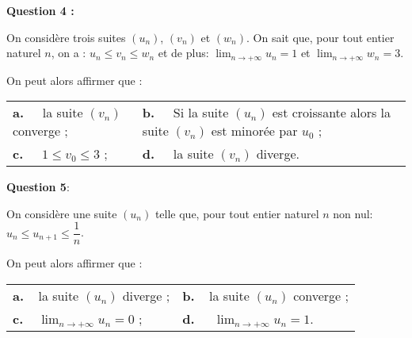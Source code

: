 \documentclass[11pt,a4paper,french]{article}
\newcommand{\N}{\mathbb{N}}
\begin{document}
\textbf{Question 4 :}

\medskip

On considère trois suites $\left(u_n\right)$, $\left(v_n\right)$ et $\left(w_n\right)$. On sait que, pour tout entier naturel $n$, on a : $u_n \leqslant v_n\leqslant  w_n$ et de plus: $\displaystyle\lim_{n \to + \infty} u_n= 1$ et $\displaystyle\lim_{n \to + \infty} w_n= 3$.

On peut alors affirmer que :

\begin{center}
\begin{tabularx}{\linewidth}{X X}
\textbf{a.~~} la suite $\left(v_n\right)$ converge ;&\textbf{b.~~} Si la suite 
$\left(u_n\right)$ est croissante alors la suite $\left(v_n\right)$ est minorée par $u_0$ ;\\
\textbf{c.~~} $1 \leqslant  v_0 \leqslant 3$ ;&\textbf{d.~~} la suite $\left(v_n\right)$ diverge.
\end{tabularx}
\end{center}

\medskip

\textbf{Question 5}:

\medskip

On considère une suite $\left(u_n\right)$ telle que, pour tout entier naturel $n$ non nul: $u_n \leqslant  u_{n+1}  \leqslant \dfrac1n$.

On peut alors affirmer que : 

\begin{center}
\begin{tabularx}{\linewidth}{X X}
\textbf{a.~~}la suite $\left(u_n\right)$ diverge ;&\textbf{b.~~}la suite $\left(u_n\right)$ converge ;\\
\textbf{c.~~}$\displaystyle\lim_{n \to + \infty} u_n =  0$ ;&\textbf{d.~~} $\displaystyle\lim_{n \to + \infty} u_n =  1$.
\end{tabularx}
\end{center}
\medskip
\end{document}
